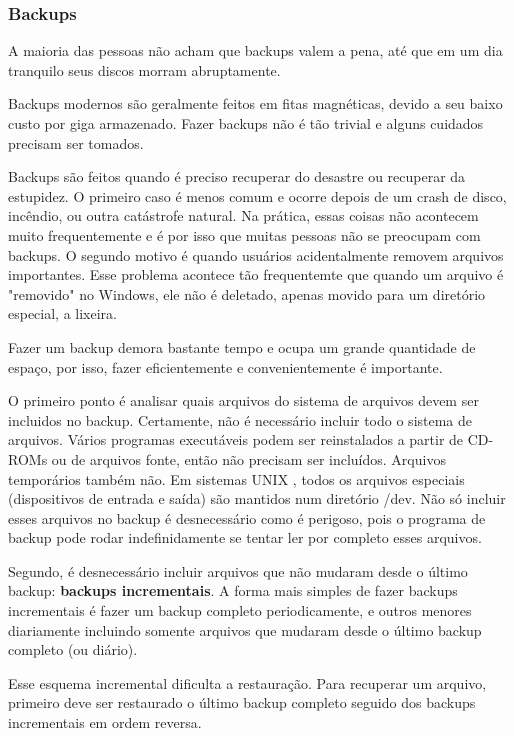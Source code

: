 \documentclass{article}
\newcommand\unix{{\color{red}UNIX} }
\begin{document}
\subsubsection{Backups}

A maioria das pessoas não acham que backups valem a pena, até que em um dia tranquilo seus discos morram abruptamente. 

Backups modernos são geralmente feitos em fitas magnéticas, devido a seu baixo custo por giga armazenado. Fazer backups não é tão trivial e alguns cuidados precisam ser tomados.  

Backups são feitos quando é preciso recuperar do desastre ou recuperar da estupidez. O primeiro caso é menos comum e ocorre depois de um crash de disco, incêndio, ou outra catástrofe natural. Na prática, essas coisas não acontecem muito frequentemente e é por isso que muitas pessoas não se preocupam com backups. O segundo motivo é quando usuários acidentalmente removem arquivos importantes. Esse problema acontece tão frequentemte que quando um arquivo é "removido" no Windows, ele não é deletado, apenas movido para um diretório especial, a lixeira.

Fazer um backup demora bastante tempo e ocupa um grande quantidade de espaço, por isso, fazer eficientemente e convenientemente é importante.

O primeiro ponto é analisar quais arquivos do sistema de arquivos devem ser incluidos no backup. Certamente, não é necessário incluir todo o sistema de arquivos. Vários programas executáveis podem ser reinstalados a partir de CD-ROMs ou de arquivos fonte, então não precisam ser incluídos. Arquivos temporários também não. Em sistemas \unix, todos os arquivos especiais (dispositivos de entrada e saída) são mantidos num diretório /dev. Não só incluir esses arquivos no backup é desnecessário como é perigoso, pois o programa de backup pode rodar indefinidamente se tentar ler por completo esses arquivos. 

Segundo, é desnecessário incluir arquivos que não mudaram desde o último backup: \textbf{backups incrementais}. A forma mais simples de fazer backups incrementais é fazer um backup completo periodicamente, e outros menores diariamente incluindo somente arquivos que mudaram desde o último backup completo (ou diário).

Esse esquema incremental dificulta a restauração. Para recuperar um arquivo, primeiro deve ser restaurado o último backup completo seguido dos backups incrementais em ordem reversa.
\end{document}
